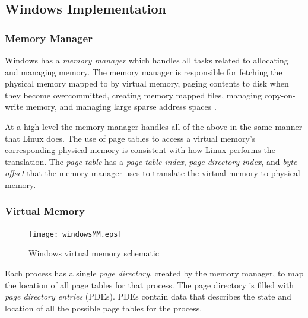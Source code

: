 \documentclass[onecolumn,draftclsnofoot, 10pt, compsoc]{IEEEtran}
\begin{document}
	\subsection{Windows Implementation}
		\subsubsection{Memory Manager}	
			Windows has a \textit{memory manager} which handles all tasks related to allocating and managing memory. 
			The memory manager is responsible for fetching the physical memory mapped to by virtual memory, paging contents to disk when they become overcommitted, creating memory mapped files, managing copy-on-write memory, and managing large sparse address spaces \cite{windowsMM}.
			
			At a high level the memory manager handles all of the above in the same manner that Linux does.
			The use of page tables to access a virtual memory's corresponding physical memory is consistent with how Linux performs the translation.
			The \textit{page table} has a \textit{page table index}, \textit{page directory index}, and \textit{byte offset} that the memory manager uses to translate the virtual memory to physical memory.
	
		\subsubsection{Virtual Memory}
			\begin{figure}[H]
				\texttt{[image: windowsMM.eps]}
				\centering
				\caption{Windows virtual memory schematic \cite{windowsMM}}
				\label{fig:mesh4}
			\end{figure}
	
			Each process has a single \textit{page directory}, created by the memory manager, to map the location of all page tables for that process.
			The page directory is filled with \textit{page directory entries} (PDEs).
			PDEs contain data that describes the state and location of all the possible page tables for the process. 
	
\end{document}
